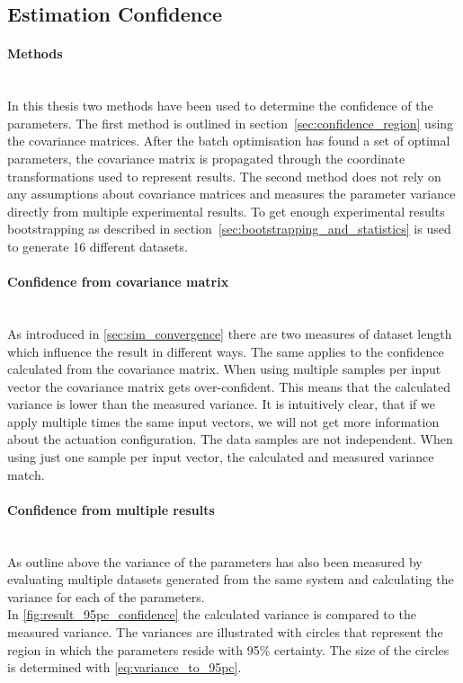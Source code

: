 \subsection{Estimation Confidence}
\paragraph{Methods} ~\\
In this thesis two methods have been used to determine  the confidence of the parameters.
The first method is outlined in section~\ref{sec:confidence_region} using the covariance matrices.
After the batch optimisation has found a set of optimal parameters, the covariance matrix is propagated through the coordinate transformations used to represent results.
The second method does not rely on any assumptions about covariance matrices and measures the parameter variance directly from multiple experimental results.
To get enough experimental results bootstrapping as described in section~\ref{sec:bootstrapping_and_statistics} is used to generate 16 different datasets.

\paragraph{Confidence from covariance matrix} ~\\
As introduced in \cref{sec:sim_convergence} there are two measures of dataset length which influence the result in different ways.
The same applies to the confidence calculated from the covariance matrix.
When using multiple samples per input vector the covariance matrix gets over-confident.
This means that the calculated variance is lower than the measured variance.
It is intuitively clear, that if we apply multiple times the same input vectors, we will not get more information about the actuation configuration.
The data samples are not independent.
When using just one sample per input vector, the calculated and measured variance match.

\paragraph{Confidence from multiple results} ~\\
As outline above the variance of the parameters has also been measured by evaluating multiple datasets generated from the same system and calculating the variance for each of the parameters.\\

In \cref{fig:result_95pc_confidence} the calculated variance is compared to the measured variance.
The variances are illustrated with circles that represent the region in which the parameters reside with 95\% certainty.
The size of the circles is determined with \cref{eq:variance_to_95pc}.

